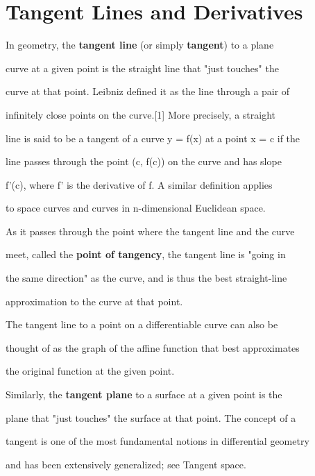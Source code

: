 \section{Tangent Lines and Derivatives}
\label{sec:tangent-lines-and-derivatives}

In geometry, the \textbf{tangent line} (or simply \textbf{tangent}) to a plane

curve at a given point is the straight line that "just touches" the

curve at that point. Leibniz defined it as the line through a pair of

infinitely close points on the curve.[1] More precisely, a straight

line is said to be a tangent of a curve y = f(x) at a point x = c if the

line passes through the point (c, f(c)) on the curve and has slope

f'(c), where f' is the derivative of f. A similar definition applies

to space curves and curves in n-dimensional Euclidean space.



As it passes through the point where the tangent line and the curve

meet, called the \textbf{point of tangency}, the tangent line is "going in

the same direction" as the curve, and is thus the best straight-line

approximation to the curve at that point.



The tangent line to a point on a differentiable curve can also be

thought of as the graph of the affine function that best approximates

the original function at the given point.



Similarly, the \textbf{tangent plane} to a surface at a given point is the

plane that "just touches" the surface at that point. The concept of a

tangent is one of the most fundamental notions in differential geometry

and has been extensively generalized; see Tangent space.



